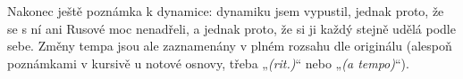 \documentclass[11pt,a4paper]{article}
\begin{document}
Nakonec ještě poznámka k dynamice: dynamiku jsem vypustil, jednak proto, že se s ní ani Rusové moc nenadřeli, a jednak proto, že si ji každý stejně udělá podle sebe. Změny tempa jsou ale zaznamenány v plném rozsahu dle originálu (alespoň poznámkami v kursivě u notové osnovy, třeba „\emph{(rit.)}“ nebo „\emph{(a tempo)}“).

















\end{document}
